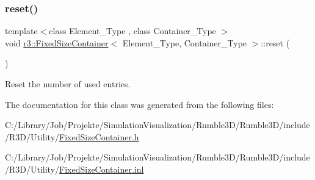 \subsubsection{\texorpdfstring{reset()}{reset()}}
{\footnotesize\ttfamily template$<$class Element\+\_\+\+Type , class Container\+\_\+\+Type $>$ \\
void \mbox{\hyperlink{classr3_1_1_fixed_size_container}{r3\+::\+Fixed\+Size\+Container}}$<$ Element\+\_\+\+Type, Container\+\_\+\+Type $>$\+::reset (\begin{DoxyParamCaption}{ }\end{DoxyParamCaption})}



Reset the number of used entries. 



The documentation for this class was generated from the following files\+:\begin{DoxyCompactItemize}
\item 
C\+:/\+Library/\+Job/\+Projekte/\+Simulation\+Visualization/\+Rumble3\+D/\+Rumble3\+D/include/\+R3\+D/\+Utility/\mbox{\hyperlink{_fixed_size_container_8h}{Fixed\+Size\+Container.\+h}}\item 
C\+:/\+Library/\+Job/\+Projekte/\+Simulation\+Visualization/\+Rumble3\+D/\+Rumble3\+D/include/\+R3\+D/\+Utility/\mbox{\hyperlink{_fixed_size_container_8inl}{Fixed\+Size\+Container.\+inl}}\end{DoxyCompactItemize}
